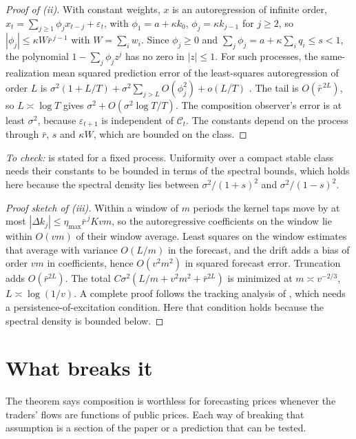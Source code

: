 \documentclass[11pt]{article}
\theoremstyle{remark}\newtheorem{remark}[theorem]{Remark}
\begin{document}
\begin{proof}[Proof of (ii)]
With constant weights, $x$ is an autoregression of infinite order, $x_t=\sum_{j\ge1}\phi_jx_{t-j}+\varepsilon_t$, with $\phi_1=a+\kappa k_0$, $\phi_{j}=\kappa k_{j-1}$ for $j\ge2$, so $|\phi_j|\le \kappa W\bar r^{\,j-1}$ with $W=\sum_iw_i$. Since $\phi_j\ge0$ and $\sum_j\phi_j=a+\kappa\sum_iq_i\le s<1$, the polynomial $1-\sum_j\phi_jz^j$ has no zero in $|z|\le1$. For such processes, the same-realization mean squared prediction error of the least-squares autoregression of order $L$ is $\sigma^2(1+L/T)+\sigma^2\sum_{j>L}O(\phi_j^2)+o(L/T)$ \citep{ingwei2003}. The tail is $O(\bar r^{\,2L})$, so $L\asymp\log T$ gives $\sigma^2+O(\sigma^2\log T/T)$. The composition observer's error is at least $\sigma^2$, because $\varepsilon_{t+1}$ is independent of $\mathcal C_t$. The constants depend on the process through $\bar r$, $s$ and $\kappa W$, which are bounded on the class.
\end{proof}
\noindent\emph{To check:} \citet{ingwei2003} is stated for a fixed process. Uniformity over a compact stable class needs their constants to be bounded in terms of the spectral bounds, which holds here because the spectral density lies between $\sigma^2/(1+s)^2$ and $\sigma^2/(1-s)^2$.

\begin{proof}[Proof sketch of (iii)]
Within a window of $m$ periods the kernel taps move by at most $|\Delta k_{j}|\le\eta_{\max}\bar r^{\,j}Kvm$, so the autoregressive coefficients on the window lie within $O(vm)$ of their window average. Least squares on the window estimates that average with variance $O(L/m)$ in the forecast, and the drift adds a bias of order $vm$ in coefficients, hence $O(v^2m^2)$ in squared forecast error. Truncation adds $O(\bar r^{2L})$. The total $C\sigma^2(L/m+v^2m^2+\bar r^{2L})$ is minimized at $m\asymp v^{-2/3}$, $L\asymp\log(1/v)$. A complete proof follows the tracking analysis of \citet{guoljung1995}, which needs a persistence-of-excitation condition. Here that condition holds because the spectral density is bounded below.
\end{proof}

\section{What breaks it}
The theorem says composition is worthless for forecasting prices whenever the traders' flows are functions of public prices. Each way of breaking that assumption is a section of the paper or a prediction that can be tested.
\end{document}

